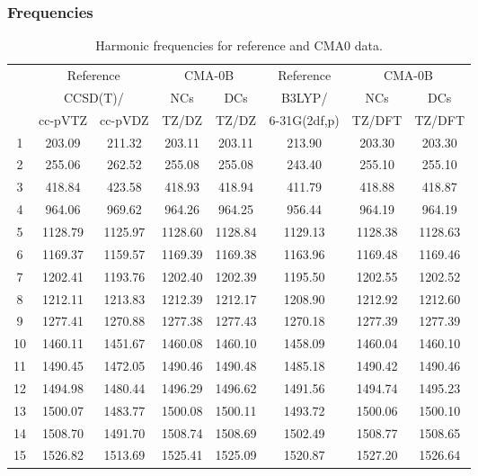 \documentclass[10pt,oneside]{article}
\begin{document}
\subsubsection*{Frequencies}
\begin{table}[h!]
\centering
\caption{Harmonic frequencies for reference and CMA0 data.}
\begin{tabular}{cccccccc}
\toprule
{} & \multicolumn{2}{c}{Reference} & \multicolumn{2}{c}{CMA-0B} &    Reference & \multicolumn{2}{c}{CMA-0B} \\
{} & \multicolumn{2}{c}{CCSD(T)/} &     NCs &     DCs &       B3LYP/ &     NCs &     DCs \\
{} &   cc-pVTZ & cc-pVDZ &   TZ/DZ &   TZ/DZ & 6-31G(2df,p) &  TZ/DFT &  TZ/DFT \\
\midrule
1  &    203.09 &  211.32 &  203.11 &  203.11 &       213.90 &  203.30 &  203.30 \\
2  &    255.06 &  262.52 &  255.08 &  255.08 &       243.40 &  255.10 &  255.10 \\
3  &    418.84 &  423.58 &  418.93 &  418.94 &       411.79 &  418.88 &  418.87 \\
4  &    964.06 &  969.62 &  964.26 &  964.25 &       956.44 &  964.19 &  964.19 \\
5  &   1128.79 & 1125.97 & 1128.60 & 1128.84 &      1129.13 & 1128.38 & 1128.63 \\
6  &   1169.37 & 1159.57 & 1169.39 & 1169.38 &      1163.96 & 1169.48 & 1169.46 \\
7  &   1202.41 & 1193.76 & 1202.40 & 1202.39 &      1195.50 & 1202.55 & 1202.52 \\
8  &   1212.11 & 1213.83 & 1212.39 & 1212.17 &      1208.90 & 1212.92 & 1212.60 \\
9  &   1277.41 & 1270.88 & 1277.38 & 1277.43 &      1270.18 & 1277.39 & 1277.39 \\
10 &   1460.11 & 1451.67 & 1460.08 & 1460.10 &      1458.09 & 1460.04 & 1460.10 \\
11 &   1490.45 & 1472.05 & 1490.46 & 1490.48 &      1485.18 & 1490.42 & 1490.46 \\
12 &   1494.98 & 1480.44 & 1496.29 & 1496.62 &      1491.56 & 1494.74 & 1495.23 \\
13 &   1500.07 & 1483.77 & 1500.08 & 1500.11 &      1493.72 & 1500.06 & 1500.10 \\
14 &   1508.70 & 1491.70 & 1508.74 & 1508.69 &      1502.49 & 1508.77 & 1508.65 \\
15 &   1526.82 & 1513.69 & 1525.41 & 1525.09 &      1520.87 & 1527.20 & 1526.64 \\

\end{tabular}
\end{table}
\end{document}
